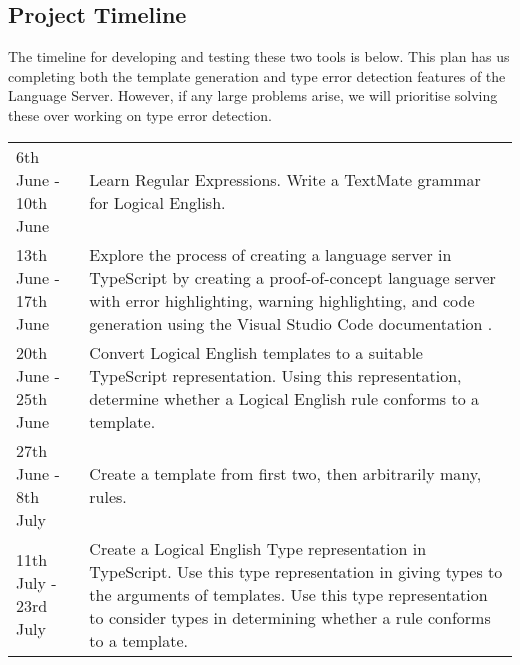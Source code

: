 \documentclass[../main.tex]{subfiles}
\begin{document}
\subsection*{Project Timeline}
The timeline for developing and testing these two tools is below. This plan has us completing both the template generation and type error detection features of the Language Server. However, if any large problems arise, we will prioritise solving these over working on type error detection.
\\
\begin{tabular}{l|p{50mm}}
    6th June - 10th June & Learn Regular Expressions. Write a TextMate grammar for Logical English. 
    \\
    13th June - 17th June & Explore the process of creating a language server in TypeScript by creating a proof-of-concept language server with error highlighting, warning highlighting, and code generation using the Visual Studio Code documentation \cite[]{vsc_langserver_features}.
    \\
    20th June - 25th June & Convert Logical English templates to a suitable TypeScript representation. Using this representation, determine whether a Logical English rule conforms to a template.
    \\
    27th June - 8th July & Create a template from first two, then arbitrarily many, rules.
    \\
    11th July - 23rd July & Create a Logical English Type representation in TypeScript. Use this type representation in giving types to the arguments of templates. Use this type representation to consider types in determining whether a rule conforms to a template.
\end{tabular}
\end{document}
